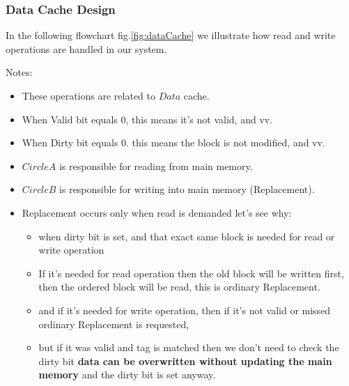     \subsubsection{Data Cache Design}

    In the following flowchart fig.\ref{fig:dataCache} we illustrate how read and write operations are
    handled in our system.\newline

    Notes:
    \begin{itemize}
        \item These operations are related to $Data$ cache.
        \item When Valid bit equals 0, this means it's not valid, and vv.
        \item When Dirty bit equals 0. this means the block is not modified, and vv.
        \item $Circle A$ is responsible for reading from main memory.
        \item $Circle B$ is responsible for writing into main memory (Replacement).
        \item Replacement occurs only when read is demanded let's see why:
            \begin{itemize}
                \item when dirty bit is set, and that exact same block is needed for read or write operation
                \item If it's needed for read operation then the old block will be written first,
                    then the ordered block will be read, this is ordinary Replacement.
                \item and if it's needed for write operation, then if it's not valid or missed ordinary Replacement
                is requested,
                \item but if it was valid and tag is matched then we don't need to check the dirty bit
                \textbf{data can be overwritten without updating the main memory} and the dirty bit is set anyway.
            \end{itemize}
    \end{itemize}


